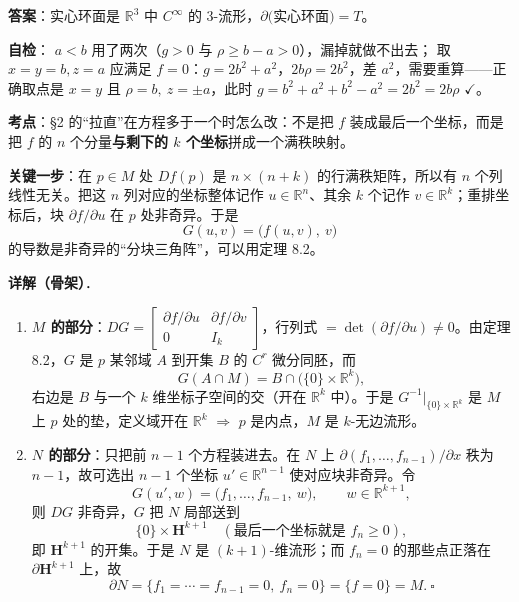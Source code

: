\documentclass[11pt]{ctexart}
\renewcommand{\qbreak}{\needspace{0.22\textheight}}
\newcommand{\HH}{\mathbf{H}}
\begin{document}
\textbf{答案}：实心环面是 $\mathbb{R}^3$ 中 $C^\infty$ 的 3-流形，$\partial($实心环面$)=T$。

\textbf{自检}： $a<b$ 用了两次（$g>0$ 与 $\rho\ge b-a>0$），漏掉就做不出去； 取 $x=y=b,z=a$ 应满足 $f=0$：$g=2b^2+a^2$，$2b\rho=2b^2$，差 $a^2$，需要重算——正确取点是 $x=y$ 且 $\rho=b,\ z=\pm a$，此时 $g=b^2+a^2+b^2-a^2=2b^2=2b\rho$ $\checkmark$。

\qbreak
{}\label{ax2}

\textbf{考点}：§2 的“拉直”在方程多于一个时怎么改：不是把 $f$ 装成最后一个坐标，而是把 $f$ 的 $n$ 个分量\textbf{与剩下的 $k$ 个坐标}拼成一个满秩映射。

\textbf{关键一步}：在 $p\in M$ 处 $Df(p)$ 是 $n\times(n+k)$ 的行满秩矩阵，所以有 $n$ 个列线性无关。把这 $n$ 列对应的坐标整体记作 $u\in\mathbb{R}^n$、其余 $k$ 个记作 $v\in\mathbb{R}^k$；重排坐标后，块 $\partial f/\partial u$ 在 $p$ 处非奇异。于是
\[ G(u,v)=\bigl(f(u,v),\ v\bigr) \]
的导数是非奇异的“分块三角阵”，可以用定理 8.2。

\textbf{详解（骨架）}．
\begin{enumerate}
  \item \textbf{$M$ 的部分}：$DG=\begin{bmatrix}\partial f/\partial u&\partial f/\partial v\\0&I_k\end{bmatrix}$，行列式 $=\det(\partial f/\partial u)\ne0$。由定理 8.2，$G$ 是 $p$ 某邻域 $A$ 到开集 $B$ 的 $C^r$ 微分同胚，而
  \[ G(A\cap M)=B\cap\bigl(\{0\}\times\mathbb{R}^k\bigr), \]
  右边是 $B$ 与一个 $k$ 维坐标子空间的交（开在 $\mathbb{R}^k$ 中）。于是 $G^{-1}|_{\{0\}\times\mathbb{R}^k}$ 是 $M$ 上 $p$ 处的垫，定义域开在 $\mathbb{R}^k$ $\Rightarrow$ $p$ 是内点，$M$ 是 $k$-无边流形。
  \item \textbf{$N$ 的部分}：只把前 $n-1$ 个方程装进去。在 $N$ 上 $\partial(f_1,\dots,f_{n-1})/\partial x$ 秩为 $n-1$，故可选出 $n-1$ 个坐标 $u'\in\mathbb{R}^{n-1}$ 使对应块非奇异。令
  \[ G(u',w)=\bigl(f_1,\dots,f_{n-1},\ w\bigr),\qquad w\in\mathbb{R}^{k+1}, \]
  则 $DG$ 非奇异，$G$ 把 $N$ 局部送到
  \[ \{0\}\times\HH^{k+1}\quad(\text{最后一个坐标就是 }f_n\ge0), \]
  即 $\HH^{k+1}$ 的开集。于是 $N$ 是 $(k+1)$-维流形；而 $f_n=0$ 的那些点正落在 $\partial\HH^{k+1}$ 上，故
  \[ \partial N=\{f_1=\cdots=f_{n-1}=0,\ f_n=0\}=\{f=0\}=M.\ \square \]
\end{enumerate}
\end{document}

